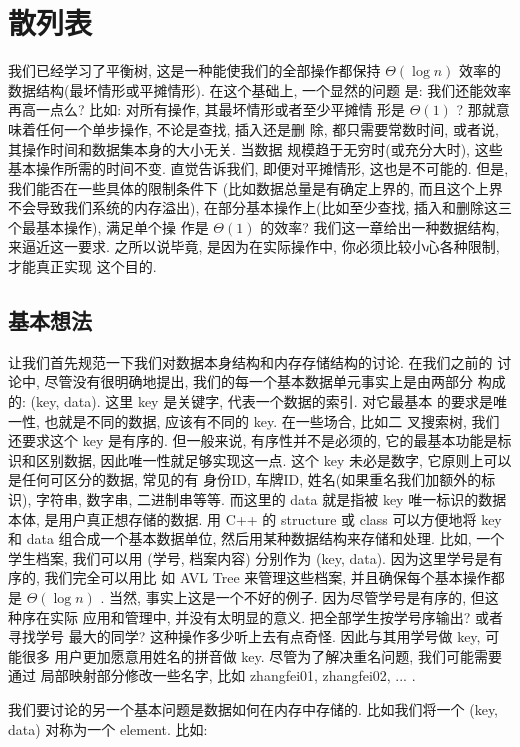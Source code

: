\documentclass[a4paper]{ctexart}
\theoremstyle{definition}
\theoremstyle{definition}
\begin{document}
\section{散列表}

我们已经学习了平衡树, 这是一种能使我们的全部操作都保持 $\Theta(\log
n)$ 效率的数据结构(最坏情形或平摊情形). 在这个基础上, 一个显然的问题
是: 我们还能效率再高一点么? 比如: 对所有操作, 其最坏情形或者至少平摊情
形是 $\Theta(1)$ ? 那就意味着任何一个单步操作, 不论是查找, 插入还是删
除, 都只需要常数时间, 或者说, 其操作时间和数据集本身的大小无关. 当数据
规模趋于无穷时(或充分大时), 这些基本操作所需的时间不变. 直觉告诉我们,
即便对平摊情形, 这也是不可能的. 但是, 我们能否在一些具体的限制条件下
(比如数据总量是有确定上界的, 而且这个上界不会导致我们系统的内存溢出),
在部分基本操作上(比如至少查找, 插入和删除这三个最基本操作), 满足单个操
作是 $\Theta(1)$ 的效率? 我们这一章给出一种数据结构, 来逼近这一要求.
之所以说毕竟, 是因为在实际操作中, 你必须比较小心各种限制, 才能真正实现
这个目的.

\subsection{基本想法}

让我们首先规范一下我们对数据本身结构和内存存储结构的讨论. 在我们之前的
讨论中, 尽管没有很明确地提出, 我们的每一个基本数据单元事实上是由两部分
构成的: (key, data). 这里 key 是关键字, 代表一个数据的索引. 对它最基本
的要求是唯一性, 也就是不同的数据, 应该有不同的 key. 在一些场合, 比如二
叉搜索树, 我们还要求这个 key 是有序的. 但一般来说, 有序性并不是必须的,
它的最基本功能是标识和区别数据, 因此唯一性就足够实现这一点. 这个 key
未必是数字, 它原则上可以是任何可区分的数据, 常见的有 身份ID, 车牌ID,
姓名(如果重名我们加额外的标识), 字符串, 数字串, 二进制串等等. 而这里的
data 就是指被 key 唯一标识的数据本体, 是用户真正想存储的数据. 用 C++
的 structure 或 class 可以方便地将 key 和 data 组合成一个基本数据单位,
然后用某种数据结构来存储和处理. 比如, 一个学生档案, 我们可以用 (学号,
档案内容) 分别作为 (key, data). 因为这里学号是有序的, 我们完全可以用比
如 AVL Tree 来管理这些档案, 并且确保每个基本操作都是 $\Theta(\log n)$
. 当然, 事实上这是一个不好的例子. 因为尽管学号是有序的, 但这种序在实际
应用和管理中, 并没有太明显的意义. 把全部学生按学号序输出? 或者寻找学号
最大的同学? 这种操作多少听上去有点奇怪. 因此与其用学号做 key, 可能很多
用户更加愿意用姓名的拼音做 key. 尽管为了解决重名问题, 我们可能需要通过
局部映射部分修改一些名字, 比如 zhangfei01, zhangfei02, ... .


我们要讨论的另一个基本问题是数据如何在内存中存储的. 比如我们将一个
(key, data) 对称为一个 element. 比如:
\end{document}
